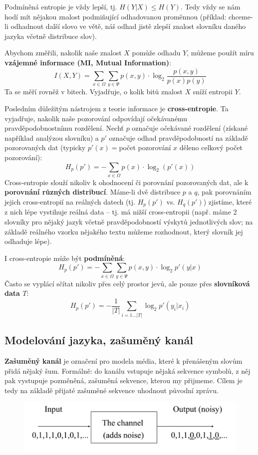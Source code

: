 \documentclass[11pt]{report} %
\numberwithin{equation}{section}
\begin{document}
Podmíněná entropie je vždy lepší, tj. $H(Y|X) \leq H(Y)$. Tedy vždy se nám hodí mít nějakou znalost podmiňující odhadovanou proměnnou (příklad: chceme-li odhadnout další slovo ve větě, náš odhad jistě zlepší znalost slovníku daného jazyka včetně distribuce slov).

Abychom změřili, nakolik naše znalost $X$ pomůže odhadu $Y$, můžeme použít míru \textbf{vzájemné informace (MI, Mutual Information)}:
$$I(X,Y) = \sum\limits_{x \in \Omega} \sum\limits_{y \in \Psi} p(x,y) \cdot \log_2 \frac{p(x,y)}{p(x)p(y)}$$ 
Ta se měří rovněž v bitech. Vyjadřuje, o kolik bitů znalost $X$ sníží entropii $Y$.

Posledním důležitým nástrojem z teorie informace je \textbf{cross-entropie}. Ta vyjadřuje, nakolik naše pozorování odpovídají očekávanému pravděpodobnostnímu rozdělení. Nechť $p$ označuje očekávané rozdělení (získané například analýzou slovníku) a $p'$ označuje odhad pravděpodobností na základě pozorovaných dat (typicky $p'(x) = $počet pozorování $x$ děleno celkový počet pozorování):
$$H_p(p') = -\sum\limits_{x \in \Omega} p(x) \cdot \log_2(p'(x))$$
Cross-entropie slouží nikoliv k ohodnocení či porovnání pozorovaných dat, ale k \textbf{porovnání různých distribucí}. Máme-li dvě distribuce $p$ a $q$, pak porovnáním jejich cross-entropií na reálných datech (tj. $H_p(p')$ vs. $H_q(p')$) zjistíme, které z nich lépe vystihuje reálná data -- tj. má nižší cross-entropii (např. máme 2 slovníky pro nějaký jazyk včetně pravděpodobností výskytů jednotlivých slov; na základě reálného vzorku nějakého textu můžeme rozhodnout, který slovník jej odhaduje lépe).

I cross-entropie může být \textbf{podmíněná}:
$$H_p(p') = -\sum\limits_{x \in \Omega} \sum\limits_{y \in \Psi} p(x,y) \cdot \log_2 p'(y|x)$$ 
Často se vyplácí sčítat nikoliv přes celý prostor jevů, ale pouze přes \textbf{slovníková data $T$}:
$$H_p(p') = -\frac{1}{|T|}\sum\limits_{i = 1 \dots |T|}\log_2 p'(y_i|x_i)$$ 

\subsection{Modelování jazyka, zašuměný kanál}
\textbf{Zašuměný kanál} je označení pro modela média, které k přenášeným slovům přidá nějaký šum. Formálně: do kanálu vstupuje nějaká sekvence symbolů, z něj pak vystupuje pozměněná, zašuměná sekvence, kterou my přijmeme. Cílem je tedy na základě přijaté zašuměné sekvence uhodnout původní zprávu.

\begin{figure}[H]
	\centering
	\includegraphics[]{img/noisy_channel.png}
\end{figure}
\end{document}
